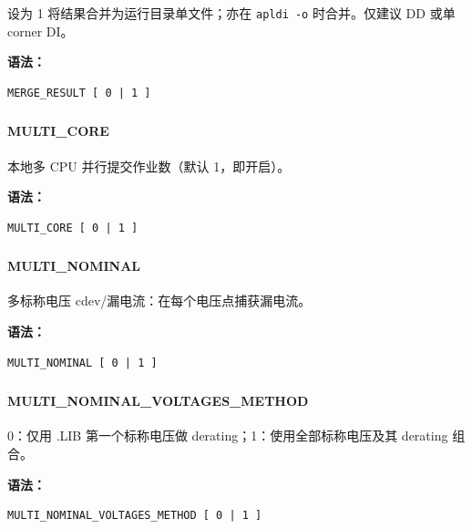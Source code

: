 设为 1 将结果合并为运行目录单文件；亦在 \texttt{apldi -o} 时合并。仅建议 DD 或单 corner DI。

\textbf{语法：}
\begin{lstlisting}
MERGE_RESULT [ 0 | 1 ]
\end{lstlisting}

\subsubsection{}
\paragraph*{MULTI_CORE}

本地多 CPU 并行提交作业数（默认 1，即开启）。

\textbf{语法：}
\begin{lstlisting}
MULTI_CORE [ 0 | 1 ]
\end{lstlisting}

\subsubsection{}
\paragraph*{MULTI_NOMINAL}

多标称电压 cdev/漏电流：在每个电压点捕获漏电流。

\textbf{语法：}
\begin{lstlisting}
MULTI_NOMINAL [ 0 | 1 ]
\end{lstlisting}

\subsubsection{}
\paragraph*{MULTI_NOMINAL_VOLTAGES_METHOD}

0：仅用 .LIB 第一个标称电压做 derating；1：使用全部标称电压及其 derating 组合。

\textbf{语法：}
\begin{lstlisting}
MULTI_NOMINAL_VOLTAGES_METHOD [ 0 | 1 ]
\end{lstlisting}

\subsubsection{}
